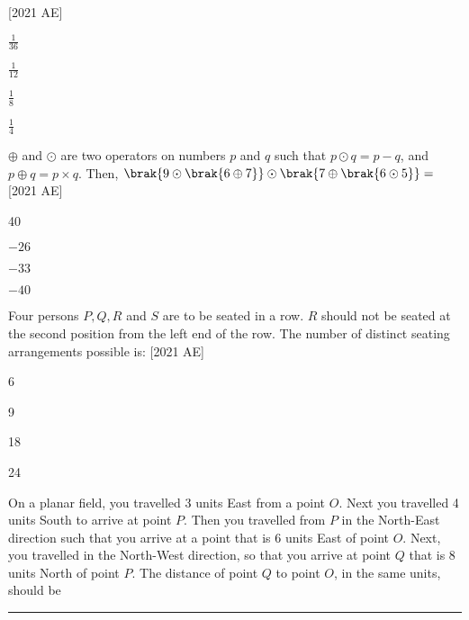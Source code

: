 \hfill [2021 AE]
\begin{enumerate}
    \begin{multicols}{4}
        \item $\frac{1}{36}$
        \item $\frac{1}{12}$
        \item $\frac{1}{8}$
        \item $\frac{1}{4}$
    \end{multicols}
\end{enumerate}
\item $\oplus$ and $\odot$ are two operators on numbers $p$ and $q$ such that $p \odot q = p - q$, and $p \oplus q = p \times q$. Then, $\brak{9 \odot \brak{6 \oplus 7}} \odot \brak{7 \oplus \brak{6 \odot 5}} = $ \hfill[2021 AE] 
\begin{enumerate}
    \begin{multicols}{2}
        \item 40
        \item $-26$
        \item $-33$
        \item $-40$
    \end{multicols}
\end{enumerate}
\item Four persons $P, Q, R$ and $S$ are to be seated in a row. $R$ should not be seated
at the second position from the left end of the row. The number of distinct
seating arrangements possible is: \hfill [2021 AE]
\begin{enumerate}
    \begin{multicols}{4}
        \item 6
        \item 9
        \item 18
        \item 24
    \end{multicols}
\end{enumerate}
\item On a planar field, you travelled 3 units East from a point $O$. Next you
travelled 4 units South to arrive at point $ P$. Then you travelled from $P$ in the
North-East direction such that you arrive at a point that is 6 units East of
point $O$. Next, you travelled in the North-West direction, so that you arrive
at point $Q$ that is 8 units North of point $P$.
The distance of point $ Q $ to point $ O$, in the same units, should be \rule{2cm}{0.4pt}

